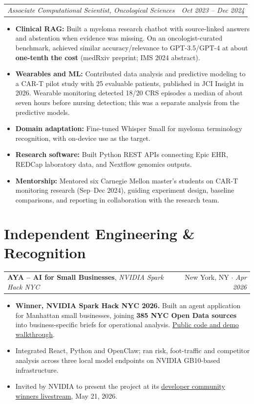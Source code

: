\documentclass[letterpaper,11pt]{article}
\makeatletter
\newcommand{\role}[2]{%
  \begin{tabularx}{\textwidth}{@{}X r@{}}
    \textit{#1} & \textit{#2} \\
  \end{tabularx}\vspace{-3pt}}
\newenvironment{bullets}{\begin{itemize}[leftmargin=12pt,itemsep=2pt,parsep=0pt,topsep=1.5pt]}{\end{itemize}\vspace{3pt}}
\newcommand{\lead}[1]{\textbf{#1}}
\newcommand{\centry}[4]{%
  \begin{tabularx}{\textwidth}{@{}X r@{}}
    \textbf{#1}, \textit{#2} & #3 $\cdot$ \textit{#4} \\
  \end{tabularx}\vspace{-3pt}}
\makeatother
\begin{document}
\role{Associate Computational Scientist, Oncological Sciences}{Oct 2023 -- Dec 2024}
\begin{bullets}
  \item \lead{Clinical RAG:} Built a myeloma research chatbot with source-linked answers and abstention when evidence was missing.
  On an oncologist-curated benchmark, achieved similar accuracy/relevance to GPT-3.5/GPT-4 at about \textbf{one-tenth the cost}
  (medRxiv preprint; IMS 2024 abstract).
  \item \lead{Wearables and ML:} Contributed data analysis and predictive modeling to a CAR-T pilot study with 25 evaluable patients,
  published in JCI Insight in 2026. Wearable monitoring detected 18/20 CRS episodes a median of about seven hours before
  nursing detection; this was a separate analysis from the predictive models.
  \item \lead{Domain adaptation:} Fine-tuned Whisper Small for myeloma terminology recognition, with on-device use as the target.
  \item \lead{Research software:} Built Python REST APIs connecting Epic EHR, REDCap laboratory data, and Nextflow genomics outputs.
  \item \lead{Mentorship:} Mentored six Carnegie Mellon master's students on CAR-T monitoring research (Sep--Dec 2024), guiding
  experiment design, baseline comparisons, and reporting in collaboration with the research team.
\end{bullets}

\section{Independent Engineering \& Recognition}
\centry{AYA -- AI for Small Businesses}{NVIDIA Spark Hack NYC}{New York, NY}{Apr 2026}
\begin{bullets}
  \item \textbf{Winner, NVIDIA Spark Hack NYC 2026.} Built an agent application for Manhattan small businesses, joining \textbf{385 NYC Open Data
  sources} into business-specific briefs for operational analysis. \href{https://github.com/Ali-Maq/aya-ai-for-small-businesses}{Public code and demo walkthrough}.
  \item Integrated React, Python and OpenClaw; ran risk, foot-traffic and competitor analysis across three local model endpoints
  on NVIDIA GB10-based infrastructure.
  \item Invited by NVIDIA to present the project at its \href{https://www.linkedin.com/events/7462280238631403520/}{developer community winners livestream}, May 21, 2026.
\end{bullets}
\end{document}

